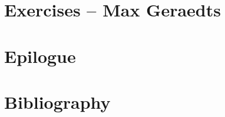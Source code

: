 \documentclass[twoside, openany, 12pt, a5paper]{book}
\begin{document}
\chapter{Exercises -- {\small Max Geraedts}} 
\backmatter

\chapter{Epilogue}

{\chapter{Bibliography}}



\end{document}
